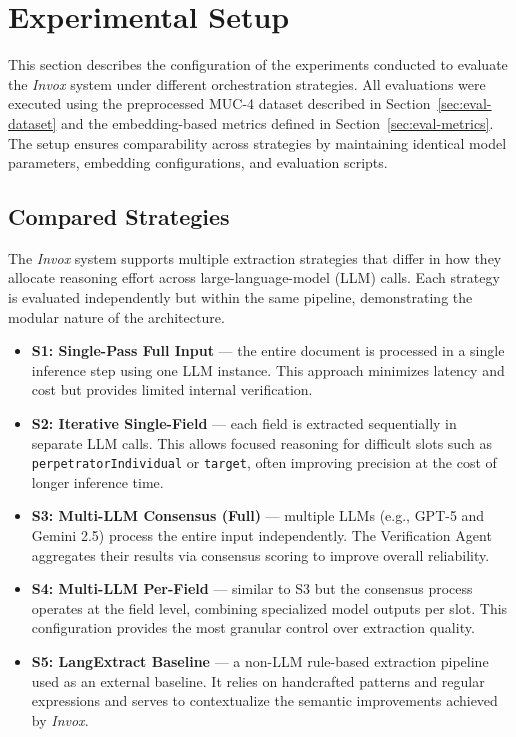 \section{Experimental Setup}
\label{sec:eval-setup}

This section describes the configuration of the experiments conducted to evaluate the \textit{Invox} system under different orchestration strategies. All evaluations were executed using the preprocessed MUC-4 dataset described in Section~\ref{sec:eval-dataset} and the embedding-based metrics defined in Section~\ref{sec:eval-metrics}.  
The setup ensures comparability across strategies by maintaining identical model parameters, embedding configurations, and evaluation scripts.

\subsection{Compared Strategies}

The \textit{Invox} system supports multiple extraction strategies that differ in how they allocate reasoning effort across large-language-model (LLM) calls. Each strategy is evaluated independently but within the same pipeline, demonstrating the modular nature of the architecture.  

\begin{itemize}
    \item \textbf{S1: Single-Pass Full Input} — the entire document is processed in a single inference step using one LLM instance. This approach minimizes latency and cost but provides limited internal verification.
    \item \textbf{S2: Iterative Single-Field} — each field is extracted sequentially in separate LLM calls. This allows focused reasoning for difficult slots such as \texttt{perpetratorIndividual} or \texttt{target}, often improving precision at the cost of longer inference time.
    \item \textbf{S3: Multi-LLM Consensus (Full)} — multiple LLMs (e.g., GPT-5 and Gemini 2.5) process the entire input independently. The Verification Agent aggregates their results via consensus scoring to improve overall reliability.
    \item \textbf{S4: Multi-LLM Per-Field} — similar to S3 but the consensus process operates at the field level, combining specialized model outputs per slot. This configuration provides the most granular control over extraction quality.
    \item \textbf{S5: LangExtract Baseline} — a non-LLM rule-based extraction pipeline used as an external baseline. It relies on handcrafted patterns and regular expressions and serves to contextualize the semantic improvements achieved by \textit{Invox}.
\end{itemize}

